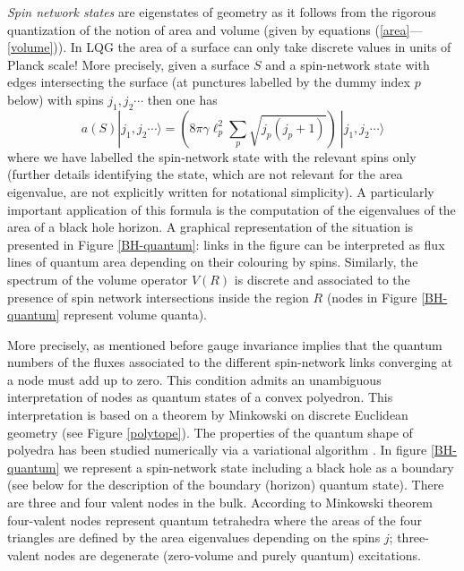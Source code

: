 \documentclass[aps, nofootinbib,superscriptaddress,12pt]{revtex4-2}
\def\be{\begin{equation}}
\def\ee{\end{equation}}
\begin{document}
{\em Spin network states} are eigenstates of geometry as it
follows from the rigorous quantization of the notion of area and
volume (given by equations (\ref{area}---\ref{volume})).  In LQG the area of a surface can only
take discrete values in units of Planck scale! More precisely, given a surface $S$ and a spin-network state with edges intersecting the surface (at punctures labelled by the dummy index $p$ below) with spins $j_1,j_2\cdots$ then one has 
\be\label{area1}
a(S) |j_1,j_2\cdots\rangle=\left(8\pi \gamma \ell_p^2  \sum_{p} \sqrt{j_p (j_p+1)}\right)\  |j_1,j_2\cdots\rangle
\ee
where we have labelled the spin-network state with the relevant spins only (further details identifying the state, which are not relevant for the area eigenvalue, are not explicitly written for notational simplicity). A particularly important application of this formula is the computation of the eigenvalues of the area of a black hole horizon. A graphical representation of the situation is presented in Figure \ref{BH-quantum}: links in the figure  can be interpreted as flux lines of quantum area depending on their colouring by spins.
Similarly, the
spectrum of the volume operator $V(R)$ is 
discrete and associated to the presence of spin network
intersections inside the region $R$ (nodes in Figure \ref{BH-quantum} represent volume quanta). 



More precisely, as mentioned before gauge invariance implies that the quantum numbers of the fluxes 
associated to the different spin-network links converging at a node must add up to zero.
This condition admits an unambiguous interpretation of nodes as quantum states of a convex polyedron.  
This interpretation is based on a theorem by Minkowski on discrete Euclidean geometry \cite{herman} (see Figure \ref{polytope}).
The properties of the quantum shape of polyedra has been studied numerically via a variational algorithm \cite{Bianchi:2010gc}. In figure \ref{BH-quantum} we represent a spin-network state including a black hole as a boundary (see below for the description of the boundary (horizon) quantum state). There are three and four valent nodes in the bulk. According to Minkowski theorem four-valent nodes represent quantum tetrahedra where the areas of the four triangles are defined by the area eigenvalues depending on the spins $j$; three-valent nodes are degenerate (zero-volume and purely quantum) excitations. 
\end{document}
